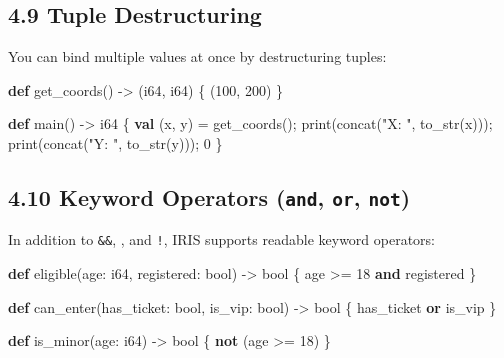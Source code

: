 \documentclass[
  english,
]{book}
\newenvironment{Shaded}{\begin{snugshade}}{\end{snugshade}}
\newcommand{\DataTypeTok}[1]{\textcolor[rgb]{0.31,0.79,0.69}{#1}}
\newcommand{\DecValTok}[1]{\textcolor[rgb]{0.71,0.81,0.66}{#1}}
\newcommand{\FunctionTok}[1]{\textcolor[rgb]{0.86,0.86,0.67}{#1}}
\newcommand{\KeywordTok}[1]{\textcolor[rgb]{0.34,0.61,0.84}{\textbf{#1}}}
\newcommand{\NormalTok}[1]{\textcolor[rgb]{0.83,0.83,0.83}{#1}}
\newcommand{\OperatorTok}[1]{\textcolor[rgb]{0.83,0.83,0.83}{#1}}
\newcommand{\StringTok}[1]{\textcolor[rgb]{0.81,0.57,0.47}{#1}}
\begin{document}
\subsection{4.9 Tuple Destructuring}\label{tuple-destructuring}

You can bind multiple values at once by destructuring tuples:

\begin{Shaded}
\begin{Highlighting}[]
\KeywordTok{def}\NormalTok{ get\_coords() }\OperatorTok{{-}\textgreater{}}\NormalTok{ (}\DataTypeTok{i64}\NormalTok{, }\DataTypeTok{i64}\NormalTok{) \{}
\NormalTok{    (}\DecValTok{100}\NormalTok{, }\DecValTok{200}\NormalTok{)}
\NormalTok{\}}

\KeywordTok{def}\NormalTok{ main() }\OperatorTok{{-}\textgreater{}} \DataTypeTok{i64}\NormalTok{ \{}
    \KeywordTok{val}\NormalTok{ (x, y) }\OperatorTok{=}\NormalTok{ get\_coords();}
    \FunctionTok{print}\NormalTok{(}\FunctionTok{concat}\NormalTok{(}\StringTok{"X: "}\NormalTok{, }\FunctionTok{to\_str}\NormalTok{(x)));}
    \FunctionTok{print}\NormalTok{(}\FunctionTok{concat}\NormalTok{(}\StringTok{"Y: "}\NormalTok{, }\FunctionTok{to\_str}\NormalTok{(y)));}
    \DecValTok{0}
\NormalTok{\}}
\end{Highlighting}
\end{Shaded}

\subsection{\texorpdfstring{4.10 Keyword Operators (\texttt{and},
\texttt{or},
\texttt{not})}{4.10 Keyword Operators (and, or, not)}}\label{keyword-operators-and-or-not}

In addition to \texttt{\&\&}, \texttt{\textbar{}\textbar{}}, and
\texttt{!}, IRIS supports readable keyword operators:

\begin{Shaded}
\begin{Highlighting}[]
\KeywordTok{def}\NormalTok{ eligible(age: }\DataTypeTok{i64}\NormalTok{, registered: }\DataTypeTok{bool}\NormalTok{) }\OperatorTok{{-}\textgreater{}} \DataTypeTok{bool}\NormalTok{ \{}
\NormalTok{    age }\OperatorTok{\textgreater{}=} \DecValTok{18} \KeywordTok{and}\NormalTok{ registered}
\NormalTok{\}}

\KeywordTok{def}\NormalTok{ can\_enter(has\_ticket: }\DataTypeTok{bool}\NormalTok{, is\_vip: }\DataTypeTok{bool}\NormalTok{) }\OperatorTok{{-}\textgreater{}} \DataTypeTok{bool}\NormalTok{ \{}
\NormalTok{    has\_ticket }\KeywordTok{or}\NormalTok{ is\_vip}
\NormalTok{\}}

\KeywordTok{def}\NormalTok{ is\_minor(age: }\DataTypeTok{i64}\NormalTok{) }\OperatorTok{{-}\textgreater{}} \DataTypeTok{bool}\NormalTok{ \{}
    \KeywordTok{not}\NormalTok{ (age }\OperatorTok{\textgreater{}=} \DecValTok{18}\NormalTok{)}
\NormalTok{\}}
\end{Highlighting}
\end{Shaded}
\end{document}
